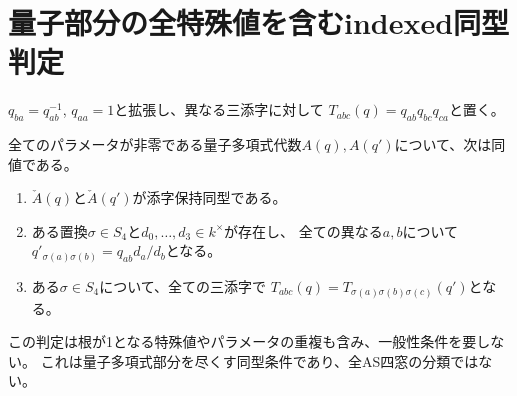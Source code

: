\section{量子部分の全特殊値を含むindexed同型判定}
\label{sec:quantum-indexed-all}

$q_{ba}=q_{ab}^{-1}$, $q_{aa}=1$と拡張し、異なる三添字に対して
$T_{abc}(q)=q_{ab}q_{bc}q_{ca}$と置く。
\begin{theorem}[量子多項式の全パラメータindexed同型]\label{thm:quantum-indexed-all}
全てのパラメータが非零である量子多項式代数$A(q),A(q')$について、次は同値である。
\begin{enumerate}
\item $\check A(q)$と$\check A(q')$が添字保持同型である。
\item ある置換$\sigma\in S_4$と$d_0,\ldots,d_3\in k^\times$が存在し、
全ての異なる$a,b$について
$q'_{\sigma(a)\sigma(b)}=q_{ab}d_a/d_b$となる。
\item ある$\sigma\in S_4$について、全ての三添字で
$T_{abc}(q)=T_{\sigma(a)\sigma(b)\sigma(c)}(q')$となる。
\end{enumerate}
この判定は根が1となる特殊値やパラメータの重複も含み、一般性条件を要しない。
これは量子多項式部分を尽くす同型条件であり、全AS四窓の分類ではない。
\end{theorem}
